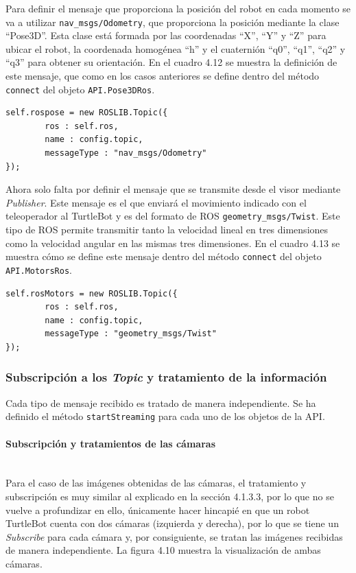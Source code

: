 Para definir el mensaje que proporciona la posición del robot en cada momento se va a utilizar \texttt{nav\_msgs/Odometry}, que proporciona la posición mediante la clase ``Pose3D''. Esta clase está formada por las coordenadas ``X'', ``Y'' y ``Z'' para ubicar el robot, la coordenada homogénea ``h'' y el cuaternión ``q0'', ``q1'', ``q2'' y ``q3''  para obtener su orientación. En el cuadro 4.12 se muestra la definición de este mensaje, que como en los casos anteriores se define dentro del método \texttt{connect} del objeto \texttt{API.Pose3DRos}.

\begin{lstlisting}[caption= Definición del mensaje para obtener el posicionamiento del TurtleBot, label=cod.mensajeposeturtle]
self.rospose = new ROSLIB.Topic({
		ros : self.ros,
		name : config.topic,
		messageType : "nav_msgs/Odometry"
});
\end{lstlisting}

Ahora solo falta por definir el mensaje que se transmite desde el visor mediante \textit{Publisher}. Este mensaje es el que enviará el movimiento indicado con el teleoperador al TurtleBot y es del formato de ROS \texttt{geometry\_msgs/Twist}. Este tipo de ROS permite transmitir tanto la velocidad lineal en tres dimensiones como la velocidad angular en las mismas tres dimensiones. En el cuadro 4.13 se muestra cómo se define este mensaje dentro del método \texttt{connect} del objeto \texttt{API.MotorsRos}.

\begin{lstlisting}[caption= Definición del mensaje para transmitir el movimiento proporcionado por el teleoperador, label=cod.mensajemotorturtle]
self.rosMotors = new ROSLIB.Topic({
		ros : self.ros,
		name : config.topic,
		messageType : "geometry_msgs/Twist"
});
\end{lstlisting}

\subsubsection{Subscripción a los \textit{Topic} y tratamiento de la información}
Cada tipo de mensaje recibido es tratado de manera independiente. Se ha definido el método \texttt{startStreaming} para cada uno de los objetos de la API.

\paragraph{Subscripción y tratamientos de las cámaras} \hspace{0pt}  \\
Para el caso de las imágenes obtenidas de las cámaras, el tratamiento y subscripción es muy similar al explicado en la sección 4.1.3.3, por lo que no se vuelve a profundizar en ello, únicamente hacer hincapié en que un robot TurtleBot cuenta con dos cámaras (izquierda y derecha), por lo que se tiene un \textit{Subscribe} para cada cámara y, por consiguiente, se tratan las imágenes recibidas de manera independiente. La figura 4.10 muestra la visualización de ambas cámaras.

